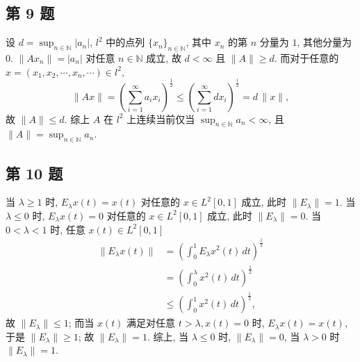 \documentclass[../main.tex]{subfiles}
\begin{document}
\subsection{第 9 题}
设 $d = \sup_{n \in \mathbb{N}} | a_n |$,
$l^2$ 中的点列 $\{ x_n \}_{n \in \mathbb{N}}$, 其中 $x_n$ 的第 $n$ 分量为 $1$, 其他分量为 $0$.
$\| A x_n \| = | a_n |$ 对任意 $n \in \mathbb{N}$ 成立,
故 $d < \infty$ 且 $\| A \| \geqslant d$.
而对于任意的 $x = (x_1, x_2, \cdots, x_n, \cdots)\in l^2$,
\[
    \| A x \| = \left( \sum_{i = 1}^{\infty} a_i x_i \right)^{\frac{1}{2}}
    \leqslant \left( \sum_{i = 1}^{\infty} d x_i \right)^{\frac{1}{2}}
    = d \, \| x \|,
\]
故 $\| A \| \leqslant d$.
综上 $A$ 在 $l^2$ 上连续当前仅当 $\sup_{n \in \mathbb{N}} a_n < \infty$,
且 $\| A \| = \sup_{n \in \mathbb{N}} a_n$.

\subsection{第 10 题}
当 $\lambda \geqslant 1$ 时, $E_{\lambda} x(t) = x(t)$ 对任意的 $x \in L^2[0, 1]$ 成立, 此时 $\| E_{\lambda} \| = 1$.
当 $\lambda \leqslant 0$ 时, $E_{\lambda} x(t) = 0$ 对任意的 $x \in L^2[0, 1]$ 成立, 此时 $\| E_{\lambda} \| = 0$. 
当 $ 0 < \lambda < 1$ 时, 任意 $x(t) \in L^2[0, 1]$
\begin{align*}
    \| E_{\lambda} x(t) \| &= \left( \int_0^1 E_{\lambda} x^2(t) \, dt \right)^{\frac{1}{2}} \\
                           &= \left(\int_0^{\lambda} x^2(t) \, dt \right)^{\frac{1}{2}} \\
                           &\leqslant \left( \int_0^1 x^2(t) \, dt \right)^{\frac{1}{2}},
\end{align*}
故 $\| E_{\lambda} \| \leqslant 1$;
而当 $x(t)$ 满足对任意 $t > \lambda, x(t) = 0$ 时, $E_{\lambda} x(t) = x(t)$, 于是 $\| E_{\lambda} \| \geqslant 1$;
故 $\| E_{\lambda} \| = 1$.
综上, 当 $\lambda \leqslant 0$ 时, $\| E_{\lambda} \| = 0$, 当 $\lambda > 0$ 时 $\| E_{\lambda} \| = 1$.
\end{document}
